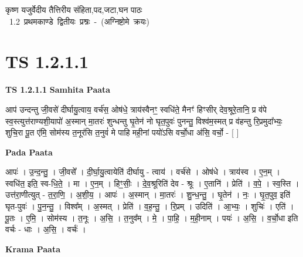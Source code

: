 \documentclass[17pt]{extarticle}
\begin{document}
\begin{titlepage}
    \begin{center}
 
\begin{sanskrit}
    { \Large
    कृष्ण यजुर्वेदीय तैत्तिरीय संहिता,पद,जटा,घन पाठः 
    }
    \\
    \vspace{2.5cm}
    \mbox{ \Large
    1.2     प्रथमकाण्डे द्वितीयः प्रश्नः - (अग्निष्टोमे क्रयः)   }
\end{sanskrit}
\end{center}

\end{titlepage}
\tableofcontents
{}
\pagebreak


\section{ TS 1.2.1.1 }

\textbf{TS 1.2.1.1 } \newline
\textbf{Samhita Paata} \newline

आप॑ उन्दन्तु जी॒वसे॑ दीर्घायु॒त्वाय॒ वर्च॑स॒ ओष॑धे॒ त्राय॑स्वैनꣳ॒॒ स्वधि॑ते॒ मैनꣳ॑ हिꣳसीर् देव॒श्रूरे॒तानि॒ प्र व॑पे स्व॒स्त्युत्त॑राण्यशी॒यापो॑ अ॒स्मान् मा॒तरः॑ शुन्धन्तु घृ॒तेन॑ नो घृत॒पुवः॑ पुनन्तु॒ विश्व॑म॒स्मत् प्र व॑हन्तु रि॒प्रमुदा᳚भ्यः॒ शुचि॒रा पू॒त ए॑मि॒ सोम॑स्य त॒नूर॑सि त॒नुवं॑ मे पाहि मही॒नां पयो॑ऽसि वर्चो॒धा अ॑सि॒ वर्चो॒ - [ ] \newline

\textbf{Pada Paata} \newline

आपः॑ । उ॒न्द॒न्तु॒ । जी॒वसे᳚ । दी॒र्घा॒यु॒त्वायेति॑ दीर्घायु - त्वाय॑ । वर्च॑से । ओष॑धे । त्राय॑स्व । ए॒न॒म् । स्वधि॑त॒ इति॒ स्व-धि॒ते॒ । मा । ए॒न॒म् । हिꣳ॒॒सीः॒ । दे॒व॒श्रूरिति॑ देव - श्रूः । ए॒तानि॑ । प्रेति॑ । व॒पे॒ । स्व॒स्ति । उत्त॑रा॒णीत्युत् - त॒रा॒णि॒ । अ॒शी॒य॒ । आपः॑ । अ॒स्मान् । मा॒तरः॑ । शु॒न्ध॒न्तु॒ । घृ॒तेन॑ । नः॒ । घृ॒त॒पुव॒ इति॑ घृत-पुवः॑ । पु॒न॒न्तु॒ । विश्व᳚म् । अ॒स्मत् । प्रेति॑ । व॒ह॒न्तु॒ । रि॒प्रम् । उदिति॑ । आ॒भ्यः॒ । शुचिः॑ । एति॑ । पू॒तः । ए॒मि॒ । सोम॑स्य । त॒नूः । अ॒सि॒ । त॒नुव᳚म् । मे॒ । पा॒हि॒ । म॒ही॒नाम् । पयः॑ । अ॒सि॒ । व॒र्चो॒धा इति वर्चः - धाः । अ॒सि॒ । वर्चः॑ ।  \newline


\textbf{Krama Paata} \newline
\end{document}
